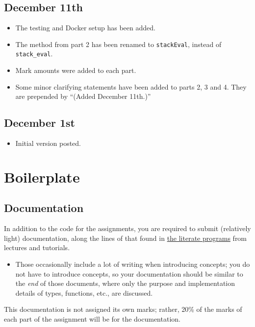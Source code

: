 \documentclass[11pt]{article}
\theoremstyle{definition}
\begin{document}
\subsection*{December 11th}
\label{sec:org721d153}
\begin{itemize}
\item The testing and Docker setup has been added.
\item The method from part 2 has been renamed to \texttt{stackEval},
instead of \texttt{stack\_eval}.
\item Mark amounts were added to each part.
\item Some minor clarifying statements have been added to parts 2, 3 and 4.
They are prepended by “(Added December 11th.)”
\end{itemize}

\subsection*{December 1st}
\label{sec:org74112cb}
\begin{itemize}
\item Initial version posted.
\end{itemize}

\section*{Boilerplate}
\label{sec:org2ad6804}
\subsection*{Documentation}
\label{sec:orgc470325}
In addition to the code for the assignments,
you are required to submit (relatively light) documentation,
along the lines of that found in
\href{https://armkeh.github.io/principles-of-programming-languages/\#outline-container-Lecture-literate-programs}{the literate programs}
from lectures and tutorials.
\begin{itemize}
\item Those occasionally include a lot of writing when introducing concepts;
you do not have to introduce concepts, so your documentation
should be similar to the \emph{end} of those documents,
where only the purpose and implementation details
of types, functions, etc., are discussed.
\end{itemize}

This documentation is not assigned its own marks;
rather, 20\% of the marks of each part of the assignment
will be for the documentation.
\end{document}
